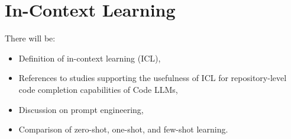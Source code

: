 \chapter{In-Context Learning}

There will be:
\begin{itemize}
    \item Definition of in-context learning (ICL),
    \item References to studies supporting the usefulness of ICL for repository-level code completion capabilities of Code LLMs,
    \item Discussion on prompt engineering,
    \item Comparison of zero-shot, one-shot, and few-shot learning.
\end{itemize}
